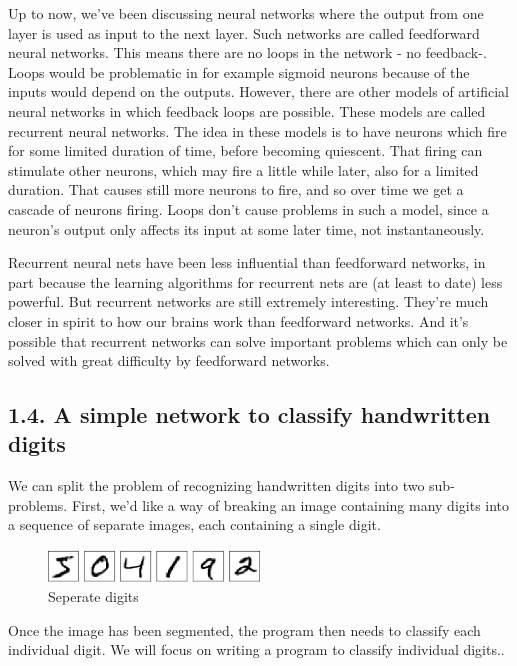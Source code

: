 \documentclass[12 pt]{article}
\begin{document}
Up to now, we've been discussing neural networks where the output from
one layer is used as input to the next layer. Such networks are called
feedforward neural networks. This means there are no loops in the
network - no feedback-. Loops would be problematic in for example
sigmoid neurons because of the inputs would depend on the outputs.
However, there are other models of artificial neural networks in which
feedback loops are possible. These models are called recurrent neural
networks. The idea in these models is to have neurons which fire for
some limited duration of time, before becoming quiescent. That firing
can stimulate other neurons, which may fire a little while later, also
for a limited duration. That causes still more neurons to fire, and so
over time we get a cascade of neurons firing. Loops don't cause problems
in such a model, since a neuron's output only affects its input at some
later time, not instantaneously.

Recurrent neural nets have been less influential than feedforward
networks, in part because the learning algorithms for recurrent nets are
(at least to date) less powerful. But recurrent networks are still
extremely interesting. They're much closer in spirit to how our brains
work than feedforward networks. And it's possible that recurrent
networks can solve important problems which can only be solved with
great difficulty by feedforward networks.

\subsection{1.4. A simple network to classify handwritten digits}
\label{a-simple-network-to-classify-handwritten-digits}

We can split the problem of recognizing handwritten digits into two
sub-problems. First, we'd like a way of breaking an image containing
many digits into a sequence of separate images, each containing a single
digit.

\begin{figure}[htp]
\centering
\includegraphics[width=0.5\textwidth]{./figs/digits_separate.png}
\caption{Seperate digits}
\end{figure}

Once the image has been segmented, the program then needs to classify
each individual digit. We will focus on writing a program to classify
individual digits..
\end{document}
